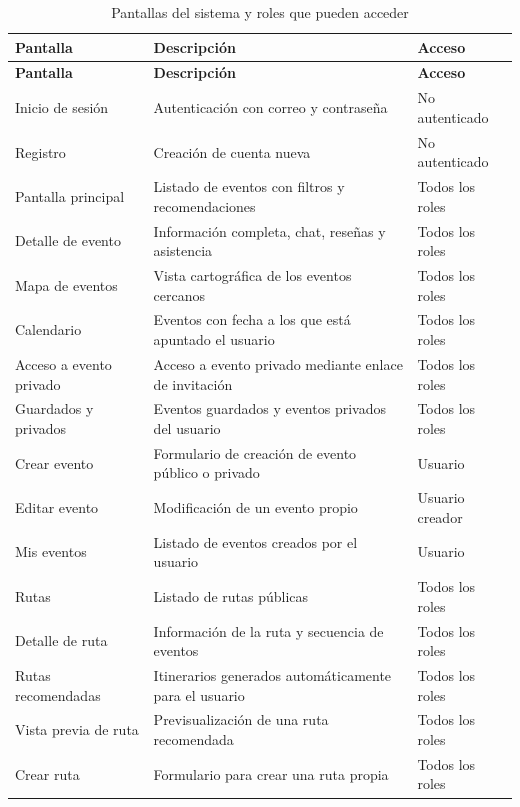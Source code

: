 {\renewcommand{\arraystretch}{1.2}
\begin{longtable}{|
>{\raggedright\arraybackslash}p{}|
>{\raggedright\arraybackslash}p{}|
>{\raggedright\arraybackslash}p{}|}
\caption{Pantallas del sistema y roles que pueden acceder}
\label{tab:pantallas}\\
\hline
\textbf{Pantalla} & \textbf{Descripción} & \textbf{Acceso} \\
\hline
\endfirsthead
\hline
\textbf{Pantalla} & \textbf{Descripción} & \textbf{Acceso} \\
\hline
\endhead
Inicio de sesión & Autenticación con correo y contraseña & No autenticado \\
\hline
Registro & Creación de cuenta nueva & No autenticado \\
\hline
Pantalla principal & Listado de eventos con filtros y recomendaciones & Todos los roles \\
\hline
Detalle de evento & Información completa, chat, reseñas y asistencia & Todos los roles \\
\hline
Mapa de eventos & Vista cartográfica de los eventos cercanos & Todos los roles \\
\hline
Calendario & Eventos con fecha a los que está apuntado el usuario & Todos los roles \\
\hline
Acceso a evento privado & Acceso a evento privado mediante enlace de invitación & Todos los roles \\
\hline
Guardados y privados & Eventos guardados y eventos privados del usuario & Todos los roles \\
\hline
Crear evento & Formulario de creación de evento público o privado & Usuario \\
\hline
Editar evento & Modificación de un evento propio & Usuario creador \\
\hline
Mis eventos & Listado de eventos creados por el usuario & Usuario \\
\hline
Rutas & Listado de rutas públicas & Todos los roles \\
\hline
Detalle de ruta & Información de la ruta y secuencia de eventos & Todos los roles \\
\hline
Rutas recomendadas & Itinerarios generados automáticamente para el usuario & Todos los roles \\
\hline
Vista previa de ruta & Previsualización de una ruta recomendada & Todos los roles \\
\hline
Crear ruta & Formulario para crear una ruta propia & Todos los roles \\

\end{longtable}}
